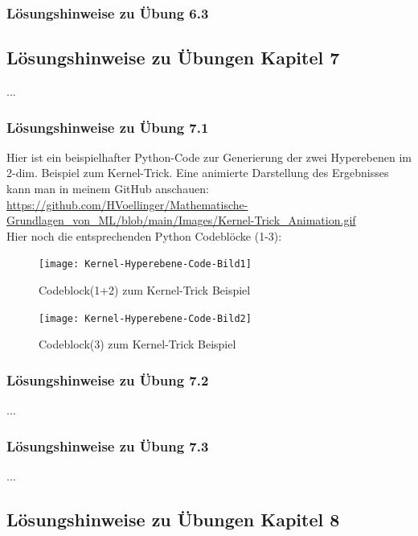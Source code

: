\documentclass[12pt]{article}
\begin{document}
\subsubsection{Lösungshinweise zu Übung 6.3}


\newpage

\subsection{Lösungshinweise zu Übungen Kapitel 7}
... \\[0.8cm]
\subsubsection{Lösungshinweise zu Übung 7.1}
Hier ist ein beispielhafter Python-Code zur Generierung der zwei Hyperebenen im 2-dim. Beispiel zum Kernel-Trick. Eine animierte Darstellung des Ergebnisses kann man in meinem GitHub anschauen: \\[0.3cm]
\url{https://github.com/HVoellinger/Mathematische-Grundlagen_von_ML/blob/main/Images/Kernel-Trick_Animation.gif} \\[0.3cm]
%
Hier noch die entsprechenden Python Codeblöcke (1-3):
%
\begin{figure}[htp]
  \centering
  \hspace*{-0.5cm} 
  \texttt{[image: Kernel-Hyperebene-Code-Bild1]}
  \caption{Codeblock(1+2) zum Kernel-Trick Beispiel}
  \label{fig:SVM_Ebenen}
\end{figure}
%
\begin{figure}[htp]
  \centering
  \hspace*{-0.5cm} 
  \texttt{[image: Kernel-Hyperebene-Code-Bild2]}
  \caption{Codeblock(3) zum Kernel-Trick Beispiel}
  \label{fig:SVM_Ebenen}
\end{figure}
%
\newpage
\subsubsection{Lösungshinweise zu Übung 7.2} 
... \\[0.8cm]
\subsubsection{Lösungshinweise zu Übung 7.3}
... \\[0.8cm]
\newpage

\subsection{Lösungshinweise zu Übungen Kapitel 8}
\end{document}
